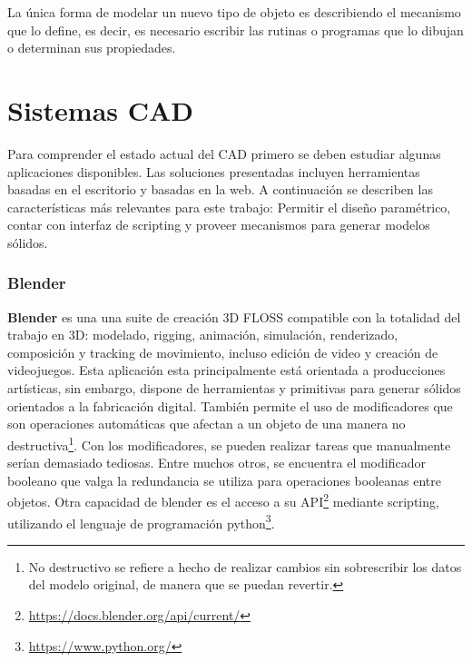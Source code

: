 La única forma de modelar un nuevo tipo de objeto es describiendo el mecanismo que lo define, es decir, es necesario escribir las rutinas o programas que lo dibujan o determinan sus propiedades.





\section{Sistemas CAD}
Para comprender el estado actual del CAD primero se deben estudiar algunas aplicaciones disponibles. 
Las soluciones presentadas incluyen herramientas basadas en el escritorio y basadas en la web. A continuación se describen las características más relevantes para este trabajo: Permitir el diseño paramétrico, contar con interfaz de scripting y proveer mecanismos para generar modelos sólidos.


\subsubsection{Blender} 
\textbf{Blender} \citep{BlenderFoundation} es una una suite de creación 3D FLOSS compatible con la totalidad del trabajo en 3D: modelado, rigging, animación, simulación, renderizado, composición y tracking de movimiento, incluso edición de video y creación de videojuegos. Esta aplicación esta principalmente está orientada a producciones artísticas, sin embargo, dispone de herramientas y primitivas para generar sólidos orientados a la fabricación digital. También permite el uso de modificadores que son operaciones automáticas que afectan a un objeto de una manera no destructiva\footnote{ No destructivo se refiere a hecho de realizar cambios sin sobrescribir los datos del modelo original, de manera que se puedan revertir.}. Con los modificadores, se pueden realizar tareas que manualmente serían demasiado tediosas. Entre muchos otros, se encuentra el modificador booleano que valga la redundancia se utiliza para  operaciones booleanas entre objetos. Otra capacidad de blender es el acceso a su API\footnote{\url{https://docs.blender.org/api/current/}} mediante scripting, utilizando el lenguaje de programación python\footnote{\url{https://www.python.org/}}.


